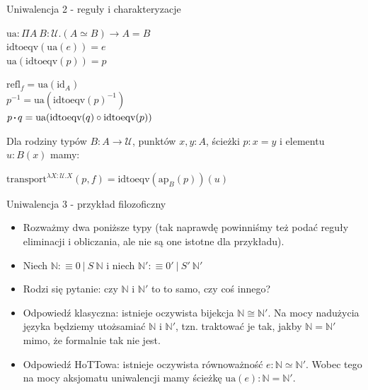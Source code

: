 \documentclass{beamer}
\newcommand{\defn}{:\equiv}
\newcommand{\U}{\mathcal{U}}
\newcommand{\id}{\text{id}}
\newcommand{\comp}{\circ}
\newcommand{\refl}[1]{\text{refl}_{#1}}
\newcommand{\inv}[1]{#1^{-1}}
\newcommand{\sq}{\mathbin{\vcenter{\hbox{\rule{.3ex}{.3ex}}}}}
\newcommand{\ap}[2]{\text{ap}_{#1}(#2)}
\newcommand{\transport}{\text{transport}}
\newcommand{\idtoeqv}{\text{idtoeqv}}
\newcommand{\ua}{\text{ua}}
\begin{document}
\begin{frame}{Uniwalencja 2 - reguły i charakteryzacje}

\begin{corollary}
$\ua : \Pi A\ B : \U. (A \simeq B) \to A = B$ \\

$\idtoeqv(\ua(e)) = e$ \\

$\ua(\idtoeqv(p)) = p$
\end{corollary}

\begin{theorem}
$\refl{f} = \ua(\id_A)$ \\

$\inv{p} = \ua(\inv{\idtoeqv(p)})$ \\

$p \sq q = \ua(\idtoeqv(q) \comp \idtoeqv(p))$
\end{theorem}

Dla rodziny typów $B : A \to \U$, punktów $x, y : A$, ścieżki $p : x = y$ i elementu $u : B(x)$ mamy:

\begin{theorem}
$\transport^{\lambda X : \U.X}(p, f) = \idtoeqv(\ap{B}{p})(u)$
\end{theorem}

\end{frame}

\begin{frame}{Uniwalencja 3 - przykład filozoficzny}
\begin{itemize}
	\item Rozważmy dwa poniższe typy (tak naprawdę powinniśmy też podać reguły eliminacji i obliczania, ale nie są one istotne dla przykładu).
	\item Niech $\mathbb{N} \defn 0 \: | \: S\ \mathbb{N}$ i niech $\mathbb{N}' \defn 0' \: | \: S'\ \mathbb{N}'$
	\item Rodzi się pytanie: czy $\mathbb{N}$ i $\mathbb{N}'$ to to samo, czy coś innego?
	\item Odpowiedź klasyczna: istnieje oczywista bijekcja $\mathbb{N} \cong \mathbb{N}'$. Na mocy nadużycia języka będziemy utożsamiać $\mathbb{N}$ i $\mathbb{N}'$, tzn. traktować je tak, jakby $\mathbb{N} = \mathbb{N}'$ mimo, że formalnie tak nie jest.
	\item Odpowiedź HoTTowa: istnieje oczywista równoważność $e : \mathbb{N} \simeq \mathbb{N}'$. Wobec tego na mocy aksjomatu uniwalencji mamy ścieżkę $\text{ua}(e) : \mathbb{N} = \mathbb{N}'$.
\end{itemize}
\end{frame}
\end{document}

